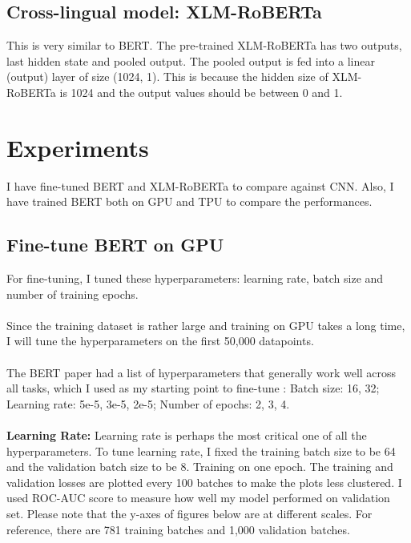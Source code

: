 \documentclass[11pt,a4paper]{article}
\begin{document}
\subsection{Cross-lingual model: XLM-RoBERTa}

This is very similar to BERT. The pre-trained XLM-RoBERTa has two outputs, last hidden state and pooled output. The pooled output is fed into a linear (output) layer of size (1024, 1). This is because the hidden size of XLM-RoBERTa is 1024 and the output values should be between 0 and 1.

\section{Experiments}

I have fine-tuned BERT and XLM-RoBERTa to compare against CNN. Also, I have trained BERT both on GPU and TPU to compare the performances.

\subsection{Fine-tune BERT on GPU}

For fine-tuning, I tuned these hyperparameters: learning rate, batch size and number of training epochs.\\
\\
Since the training dataset is rather large and training on GPU takes a long time, I will tune the hyperparameters on the first 50,000 datapoints.\\
\\
The BERT paper had a list of hyperparameters that generally work well across all tasks, which I used as my starting point to fine-tune \cite{BERT}: 
Batch size: 16, 32; Learning rate: 5e-5, 3e-5, 2e-5; Number of epochs: 2, 3, 4.\\
\\
\textbf {Learning Rate:} Learning rate is perhaps the most critical one of all the hyperparameters. To tune learning rate, I fixed the training batch size to be 64 and the validation batch size to be 8. Training on one epoch. The training and validation losses are plotted every 100 batches to make the plots less clustered. I used ROC-AUC score to measure how well my model performed on validation set. Please note that the y-axes of figures below are at different scales. For reference, there are 781 training batches and 1,000 validation batches.\\
\end{document}
